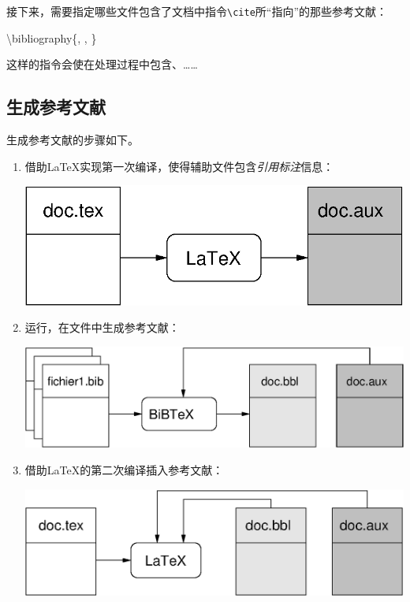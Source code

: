 接下来，需要指定哪些文件包含了文档中指令\verb|\cite|所“指向”的那些参考文献：

\begin{dmd}
\backslash bibliography\{, , \}
\end{dmd}

这样的指令会使\bib 在处理过程中包含、……

\subsection{生成参考文献}

生成参考文献的步骤如下。

\begin{enumerate}
    \item 借助\LaTeX 实现第一次编译，使得辅助文件包含\emph{引用标注}信息：
    
    \begin{center}
        \includegraphics{img/bibtex1}
    \end{center}
    
    \item 运行\bib ，在文件中生成参考文献：
    

    \begin{center}
        \includegraphics{img/bibtex2}
    \end{center}

    \item 借助\LaTeX 的第二次编译插入参考文献：
    
    \begin{center}
        \includegraphics{img/bibtex3}
    \end{center}


\end{enumerate}
